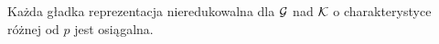 












\begin{twierdzenie}
	Każda gładka reprezentacja nieredukowalna dla $\mathcal G$ nad $\mathcal K$ o charakterystyce różnej od $p$ jest osiągalna.
\end{twierdzenie}